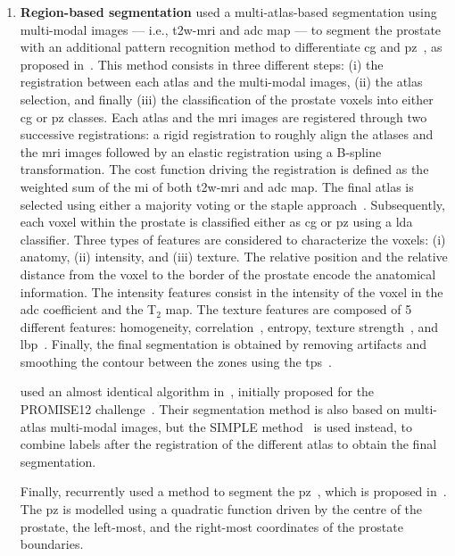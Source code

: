 \begin{enumerate}[leftmargin=*]
\item[] \textbf{Region-based segmentation}
\citeauthor{Litjens2012} used a multi-atlas-based segmentation using
multi-modal images --- i.e., \ac{t2w}-\ac{mri} and \ac{adc} map --- to segment
the prostate with an additional pattern recognition method to differentiate
\ac{cg} and \ac{pz}~\cite{Litjens2012}, as proposed in~\cite{Litjens2012a}.
This method consists in three different steps: (i) the registration between
each atlas and the multi-modal images, (ii) the atlas selection, and finally
(iii) the classification of the prostate voxels into either \ac{cg} or \ac{pz}
classes.
Each atlas and the \ac{mri} images are registered through two successive
registrations: a rigid registration to roughly align the atlases and the
\ac{mri} images followed by an elastic registration using a B-spline
transformation.
The cost function driving the registration is defined as the weighted sum of
the \ac{mi} of both \ac{t2w}-\ac{mri} and \ac{adc} map.
The final atlas is selected using either a majority voting or the \ac{staple}
approach~\cite{Warfield2004}.
Subsequently, each voxel within the prostate is classified either as \ac{cg} or
\ac{pz} using a \ac{lda} classifier.
Three types of features are considered to characterize the voxels: (i) anatomy,
(ii) intensity, and (iii) texture.
The relative position and the relative distance from the voxel to the border of
the prostate encode the anatomical information.
The intensity features consist in the intensity of the voxel in the \ac{adc}
coefficient and the T$_2$ map.
The texture features are composed of 5 different features: homogeneity,
correlation~\cite{Amadasun1989}, entropy, texture strength~\cite{Li2005a}, and
\ac{lbp}~\cite{Ojala1996}.
Finally, the final segmentation is obtained by removing artifacts and smoothing
the contour between the zones using the \ac{tps}~\cite{Bookstein1989}.

\citeauthor{Litjens2014} used an almost identical algorithm
in~\cite{Litjens2014}, initially proposed for the PROMISE12
challenge~\cite{Litjens2014a}.
Their segmentation method is also based on multi-atlas multi-modal images, but
the SIMPLE method~\cite{langerak2010label} is used instead, to combine labels
after the registration of the different atlas to obtain the final
segmentation.

Finally, \citeauthor{rampun2016computerb} recurrently used a method to segment
the
\ac{pz}~\cite{rampun2015classifying,rampun2015computer,rampun2016computer,rampun2016computerb,rampun2016quantitative},
which is proposed in~\cite{rampun2014detection}.
The \ac{pz} is modelled using a quadratic function driven by the centre of the
prostate, the left-most, and the right-most coordinates of the prostate
boundaries.


\end{enumerate}
